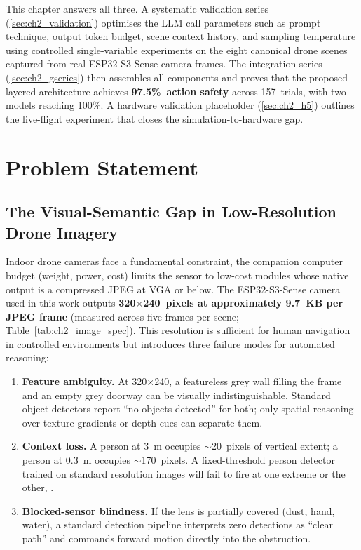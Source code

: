 This chapter answers all three. 
A systematic validation series (\ref{sec:ch2_validation}) optimises the LLM call parameters such as prompt technique, output token budget, scene context history, and sampling temperature using controlled single-variable experiments on the eight canonical drone
scenes captured from real ESP32-S3-Sense camera frames.
The integration series (\ref{sec:ch2_gseries}) then assembles all components and proves that the proposed layered architecture achieves \textbf{97.5\%~action safety} across 157~trials, with two models reaching 100\%. 
A hardware validation placeholder (\ref{sec:ch2_h5}) outlines the
live-flight experiment that closes the simulation-to-hardware gap.


\section{Problem Statement}
\label{sec:ch2_problem}

\subsection{The Visual-Semantic Gap in Low-Resolution Drone Imagery}
\label{sec:ch2_problem_gap}

Indoor drone cameras face a fundamental constraint, the companion computer budget (weight, power, cost) limits the sensor to low-cost modules whose native output is a compressed JPEG at VGA or below. The ESP32-S3-Sense camera used in this work outputs \textbf{320$\times$240~pixels at approximately 9.7~KB per JPEG frame} (measured across five frames per scene;
Table~\ref{tab:ch2_image_spec}). 
This resolution is sufficient for human navigation in controlled environments but introduces three failure modes for
automated reasoning:
\newpage
\begin{enumerate}
  \item \textbf{Feature ambiguity.} At 320$\times$240, a featureless grey wall filling the frame and an empty grey doorway can be visually indistinguishable. 
  Standard object detectors report ``no objects detected'' for both; only spatial reasoning over texture gradients or depth cues can separate them.
  \item \textbf{Context loss.} A person at 3~m occupies $\sim$20~pixels of vertical extent; a person at 0.3~m occupies $\sim$170~pixels. 
  A fixed-threshold person detector trained on standard resolution images will fail to fire at one extreme or the other, \cite{persondetectionuav2025}.
  \item \textbf{Blocked-sensor blindness.} If the lens is partially covered (dust, hand, water), a standard detection pipeline interprets zero detections as ``clear path'' and commands forward motion directly into the obstruction.
\end{enumerate}

